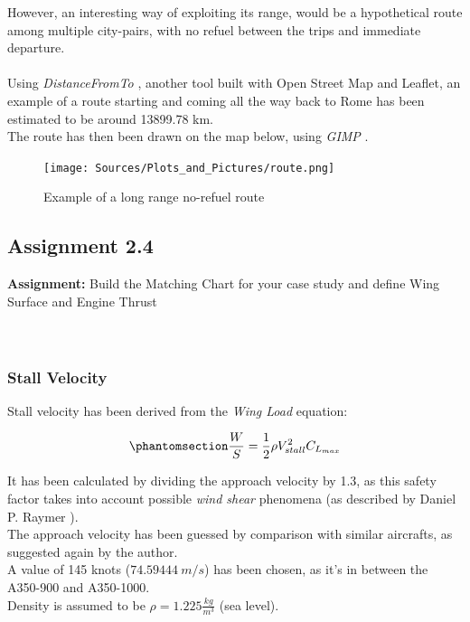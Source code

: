 \documentclass{article}
\begin{document}
\clearpage



However, an interesting way of exploiting its range, would be a hypothetical route among multiple city-pairs, with no
refuel between the trips and immediate departure. \\ \\ 
Using \textit{DistanceFromTo} \autocite{City_Distance_Calculator}, another tool built with Open Street Map and Leaflet, an example of
a route starting and coming all the way back to Rome has been estimated to be around 13899.78 km. \\ 
The route has then been drawn on the map below, using \textit{GIMP} \autocite{GIMP}. \\ 

\begin{figure}[h!]
    \centering
    \texttt{[image: Sources/Plots\_and\_Pictures/route.png]}
    \caption{Example of a long range no-refuel route}
    \label{Global_Coverage}
\end{figure}
\clearpage


\pagebreak 

\subsection{Assignment 2.4\label{Assignment_2.4}}
\textbf{Assignment:} Build the Matching Chart for your case study and define
 Wing Surface and Engine Thrust \\ \\ \\ 

 \subsubsection{Stall Velocity\label{stall_velocity}}

 Stall velocity has been derived from the \textit{Wing Load} equation: 

 \begin{equation}
     \phantomsection
     \label{wing_load_equation}
     \frac{W}{S} = \frac{1}{2} \rho V^{2}_{stall} C_{L_{max}} 
 \end{equation}
 
 
 It has been calculated by dividing
 the approach velocity by 1.3, as this safety factor takes into account possible \textit{wind shear} phenomena (as described by Daniel P. Raymer \autocite{Raymer_Daniel}). \\ 
 The approach velocity has been guessed by comparison with similar aircrafts, as suggested again by the author.\\ 
 A value of 145 knots ($74.59444 \ m/s$) has been chosen, as it's in between the A350-900 and A350-1000.\\ 
 Density is assumed to be $\rho = 1.225 \frac{kg}{m^3}$ (sea level). \\ 
\end{document}
